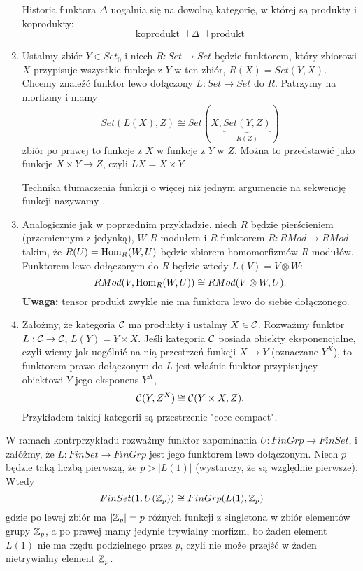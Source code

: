 \begin{enumerate}
    Historia funktora $\Delta$ uogalnia się na dowolną kategorię, w której są produkty i koprodukty:
    $$\text{koprodukt}\dashv \Delta\dashv \text{produkt}$$
  \item Ustalmy zbiór $Y\in Set_0$ i niech $R:Set\to Set$ będzie funktorem, który zbiorowi $X$ przypisuje wszystkie funkcje z $Y$ w ten zbiór, $R(X)=Set(Y,X)$. Chcemy znaleźć funktor lewo dołączony $L:Set\to Set$ do $R$. Patrzymy na morfizmy i mamy
    $$Set(L(X), Z)\cong Set(X, \underbrace{Set(Y,Z)}_{R(Z)})$$
    zbiór po prawej to funkcje z $X$ w funkcje z $Y$ w $Z$. Można to przedstawić jako funkcje $X\times Y\to Z$, czyli $LX=X\times Y$.

    Technika tłumaczenia funkcji o więcej niż jednym argumencie na sekwencję funkcji nazywamy .
  \item Analogicznie jak w poprzednim przykładzie, niech $R$ będzie pierścieniem (przemiennym z jedynką), $W$ $R$-modułem i $R$ funktorem $R:RMod\to RMod$ takim, że $R(U)=\operatorname{Hom}_R(W, U)$ będzie zbiorem homomorfizmów $R$-modułów. Funktorem lewo-dołączonym do $R$ będzie wtedy $L(V)=V\otimes W$:
    $$RMod(V, \operatorname{Hom}_R(W, U))\cong RMod(V\otimes W, U).$$
    \textbf{Uwaga:} tensor produkt zwykle nie ma funktora lewo do siebie dołączonego.
  \item Założmy, że kategoria $\mathcal{C}$ ma produkty i ustalmy $X\in \mathcal{C}$. Rozważmy funktor $L:\mathcal{C}\to \mathcal{C}$, $L(Y)=Y\times X$. Jeśli kategoria $\mathcal{C}$ posiada obiekty eksponencjalne, czyli wiemy jak uogólnić na nią przestrzeń funkcji $X\to Y$ (oznaczane $Y^X$), to funktorem prawo dołączonym do $L$ jest właśnie funktor przypisujący obiektowi $Y$ jego eksponens $Y^X$,
    $$\mathcal{C}(Y, Z^X)\cong \mathcal{C}(Y\times X, Z).$$
    Przykładem takiej kategorii są przestrzenie "core-compact".
\end{enumerate}

W ramach kontrprzykładu rozważmy funktor zapominania $U:FinGrp\to FinSet$, i załóżmy, że $L:FinSet\to FinGrp$ jest jego funktorem lewo dołączonym. Niech $p$ będzie taką liczbą pierwszą, że $p>|L(1)|$ (wystarczy, że są względnie pierwsze). Wtedy
$$FinSet(1, U(\mathbb{Z}_p))\cong FinGrp(L(1), \mathbb{Z}_p)$$
gdzie po lewej zbiór ma $|\mathbb{Z}_p|=p$ różnych funkcji z singletona w zbiór elementów grupy $\mathbb{Z}_p$, a po prawej mamy jedynie trywialny morfizm, bo żaden element $L(1)$ nie ma rzędu podzielnego przez $p$, czyli nie może przejść w żaden nietrywialny element $\mathbb{Z}_p$.



